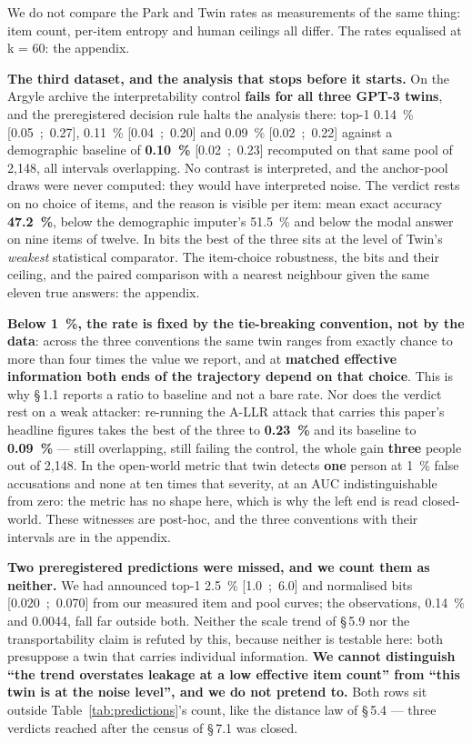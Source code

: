 \documentclass[sigconf,anonymous,review]{acmart}
\begin{document}
We do not compare the Park and Twin rates as measurements of the same thing: item count, per-item entropy and human ceilings all differ. The rates equalised at k = 60: the appendix.

\textbf{The third dataset, and the analysis that stops before it starts.} On the Argyle archive the interpretability control \textbf{fails for all three GPT-3 twins}, and the preregistered decision rule halts the analysis there: top-1 0.14~\% [0.05~;~0.27], 0.11~\% [0.04~;~0.20] and 0.09~\% [0.02~;~0.22] against a demographic baseline of \textbf{0.10~\%} [0.02~;~0.23] recomputed on that same pool of 2,148, all intervals overlapping. No contrast is interpreted, and the anchor-pool draws were never computed: they would have interpreted noise. The verdict rests on no choice of items, and the reason is visible per item: mean exact accuracy \textbf{47.2~\%}, below the demographic imputer's 51.5~\% and below the modal answer on nine items of twelve. In bits the best of the three sits at the level of Twin's \textit{weakest} statistical comparator. The item-choice robustness, the bits and their ceiling, and the paired comparison with a nearest neighbour given the same eleven true answers: the appendix.

\textbf{Below 1~\%, the rate is fixed by the tie-breaking convention, not by the data}: across the three conventions the same twin ranges from exactly chance to more than four times the value we report, and at \textbf{matched effective information both ends of the trajectory depend on that choice}. This is why \S\,1.1 reports a ratio to baseline and not a bare rate. Nor does the verdict rest on a weak attacker: re-running the A-LLR attack that carries this paper's headline figures takes the best of the three to \textbf{0.23~\%} and its baseline to \textbf{0.09~\%} --- still overlapping, still failing the control, the whole gain \textbf{three} people out of 2,148. In the open-world metric that twin detects \textbf{one} person at 1~\% false accusations and none at ten times that severity, at an AUC indistinguishable from zero: the metric has no shape here, which is why the left end is read closed-world. These witnesses are post-hoc, and the three conventions with their intervals are in the appendix.

\textbf{Two preregistered predictions were missed, and we count them as neither.} We had announced top-1 2.5~\% [1.0~;~6.0] and normalised bits [0.020~;~0.070] from our measured item and pool curves; the observations, 0.14~\% and 0.0044, fall far outside both. Neither the scale trend of \S\,5.9 nor the transportability claim is refuted by this, because neither is testable here: both presuppose a twin that carries individual information. \textbf{We cannot distinguish ``the trend overstates leakage at a low effective item count'' from ``this twin is at the noise level'', and we do not pretend to.} Both rows sit outside Table~\ref{tab:predictions}'s count, like the distance law of \S\,5.4 --- three verdicts reached after the census of \S\,7.1 was closed.
\end{document}
